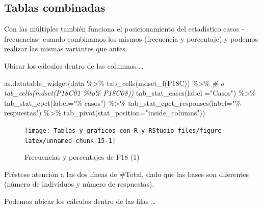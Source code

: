 \documentclass[
]{book}
\newenvironment{Shaded}{\begin{snugshade}}{\end{snugshade}}
\newcommand{\AttributeTok}[1]{\textcolor[rgb]{0.77,0.63,0.00}{#1}}
\newcommand{\CommentTok}[1]{\textcolor[rgb]{0.56,0.35,0.01}{\textit{#1}}}
\newcommand{\FunctionTok}[1]{\textcolor[rgb]{0.00,0.00,0.00}{#1}}
\newcommand{\NormalTok}[1]{#1}
\newcommand{\SpecialCharTok}[1]{\textcolor[rgb]{0.00,0.00,0.00}{#1}}
\newcommand{\StringTok}[1]{\textcolor[rgb]{0.31,0.60,0.02}{#1}}
\begin{document}
\hypertarget{tablas-combinadas}{%
\subsection{Tablas combinadas}\label{tablas-combinadas}}

Con las múltiples también funciona el posicionamiento del estadístico casos -frecuencias- cuando combinamos los mismos (frecuencia y porcentaje) y podemos realizar las mismas variantes que antes.

Ubicar los cálculos dentro de las columnas \ldots{}

\begin{Shaded}
\begin{Highlighting}[]
\FunctionTok{as.datatable\_widget}\NormalTok{(data }\SpecialCharTok{\%\textgreater{}\%} 
  \FunctionTok{tab\_cells}\NormalTok{(}\FunctionTok{mdset\_f}\NormalTok{(P18C)) }\SpecialCharTok{\%\textgreater{}\%}  \CommentTok{\# o tab\_cells(mdset(P18C01 \%to\% P18C08))}
  \FunctionTok{tab\_stat\_cases}\NormalTok{(}\AttributeTok{label =}\StringTok{"Casos"}\NormalTok{) }\SpecialCharTok{\%\textgreater{}\%} 
  \FunctionTok{tab\_stat\_cpct}\NormalTok{(}\AttributeTok{label=}\StringTok{"\% casos"}\NormalTok{) }\SpecialCharTok{\%\textgreater{}\%} 
  \FunctionTok{tab\_stat\_cpct\_responses}\NormalTok{(}\AttributeTok{label=}\StringTok{"\% respuestas"}\NormalTok{) }\SpecialCharTok{\%\textgreater{}\%} 
  \FunctionTok{tab\_pivot}\NormalTok{(}\AttributeTok{stat\_position=}\StringTok{"inside\_columns"}\NormalTok{))}
\end{Highlighting}
\end{Shaded}

\begin{figure}[H]

{\centering \texttt{[image: Tablas-y-graficos-con-R-y-RStudio\_files/figure-latex/unnamed-chunk-15-1]} 

}

\caption{Frecuencias y porcentajes de P18 (1)}\label{fig:unnamed-chunk-15}
\end{figure}

Préstese atención a las dos líneas de \#Total, dado que las bases son diferentes (número de individuos y número de respuestas).

Podemos ubicar los cálculos dentro de las filas \ldots{}
\end{document}
